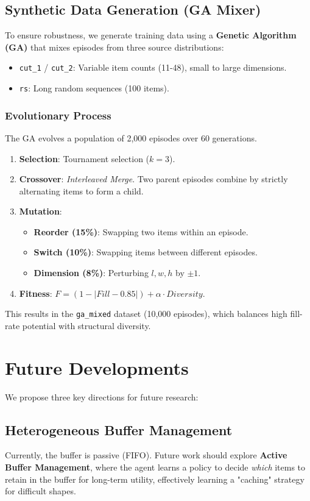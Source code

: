 \documentclass{article}
\begin{document}
\subsection{Synthetic Data Generation (GA Mixer)}
To ensure robustness, we generate training data using a \textbf{Genetic Algorithm (GA)} that mixes episodes from three source distributions:
\begin{itemize}
    \item \texttt{cut\_1} / \texttt{cut\_2}: Variable item counts (11-48), small to large dimensions.
    \item \texttt{rs}: Long random sequences (100 items).
\end{itemize}

\subsubsection{Evolutionary Process}
The GA evolves a population of 2,000 episodes over 60 generations.
\begin{enumerate}
    \item \textbf{Selection}: Tournament selection ($k=3$).
    \item \textbf{Crossover}: \textit{Interleaved Merge}. Two parent episodes combine by strictly alternating items to form a child.
    \item \textbf{Mutation}:
    \begin{itemize}
        \item \textbf{Reorder (15\%)}: Swapping two items within an episode.
        \item \textbf{Switch (10\%)}: Swapping items between different episodes.
        \item \textbf{Dimension (8\%)}: Perturbing $l,w,h$ by $\pm 1$.
    \end{itemize}
    \item \textbf{Fitness}: $F = (1 - |Fill - 0.85|) + \alpha \cdot Diversity$.
\end{enumerate}
This results in the \texttt{ga\_mixed} dataset (10,000 episodes), which balances high fill-rate potential with structural diversity.

\section{Future Developments}
We propose three key directions for future research:

\subsection{Heterogeneous Buffer Management}
Currently, the buffer is passive (FIFO). Future work should explore \textbf{Active Buffer Management}, where the agent learns a policy to decide \textit{which} items to retain in the buffer for long-term utility, effectively learning a "caching" strategy for difficult shapes.
\end{document}

